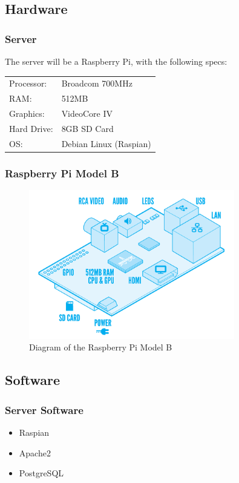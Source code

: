 \subsection{Hardware}
\begin{frame}
    \frametitle{Server}
    The server will be a Raspberry Pi, with the following specs:

    \begin{tabular}{l l}
        Processor:  & Broadcom 700MHz\\
        RAM:        & 512MB\\
        Graphics:   & VideoCore IV\\
        Hard Drive: & 8GB SD Card\\
        OS:         & Debian Linux (Raspian)\\
    \end{tabular}
\end{frame}

\begin{frame}
    \frametitle{Raspberry Pi Model B}
    \begin{figure}[htb]
        \centering
        \includegraphics[width=0.8\textwidth]{Images/RaspberryPi.png}
        \caption{Diagram of the Raspberry Pi Model B}
        \label{fig:RaspberryPi}
    \end{figure}
\end{frame}

\subsection{Software}
\begin{frame}
    \frametitle{Server Software}
    \begin{itemize}
        \item {\large Raspian}
        \item {\large Apache2}
        \item {\large PostgreSQL}
    \end{itemize}
\end{frame}

